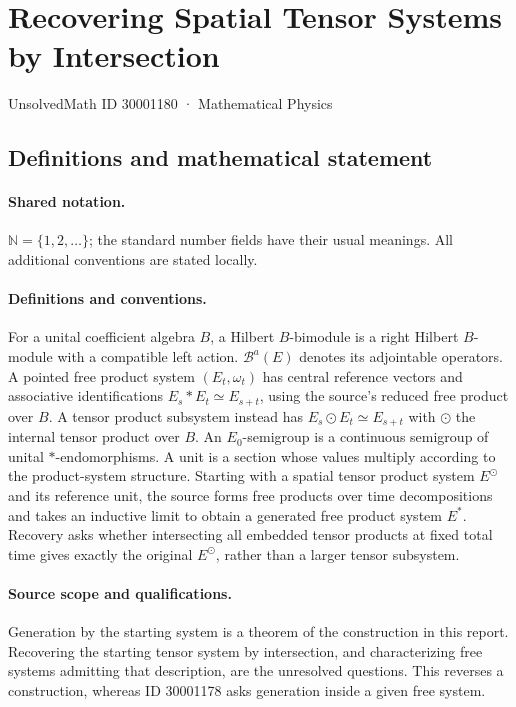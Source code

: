 \documentclass[11pt]{article}
\begin{document}
\setcounter{section}{30001179}
\section{Recovering Spatial Tensor Systems by Intersection}\label{30001180}
{\small UnsolvedMath ID 30001180 · Mathematical Physics}
\subsection{Definitions and mathematical statement}

\paragraph{Shared notation.}$\mathbb N=\{1,2,\ldots\}$; the standard number fields have their usual meanings. All additional conventions are stated locally.


\paragraph{Definitions and conventions.} For a unital coefficient algebra $B$, a Hilbert $B$-bimodule is a right Hilbert $B$-module with a compatible left action. $\mathcal B^a(E)$ denotes its adjointable operators. A pointed free product system $(E_t,\omega_t)$ has central reference vectors and associative identifications $E_s*E_t\simeq E_{s+t}$, using the source's reduced free product over $B$. A tensor product subsystem instead has $E_s\odot E_t\simeq E_{s+t}$ with $\odot$ the internal tensor product over $B$. An $E_0$-semigroup is a continuous semigroup of unital $*$-endomorphisms. A unit is a section whose values multiply according to the product-system structure. Starting with a spatial tensor product system $E^\odot$ and its reference unit, the source forms free products over time decompositions and takes an inductive limit to obtain a generated free product system $E^*$. Recovery asks whether intersecting all embedded tensor products at fixed total time gives exactly the original $E^\odot$, rather than a larger tensor subsystem.

\paragraph{Source scope and qualifications.} Generation by the starting system is a theorem of the construction in this report. Recovering the starting tensor system by intersection, and characterizing free systems admitting that description, are the unresolved questions. This reverses a construction, whereas ID 30001178 asks generation inside a given free system.
\end{document}
